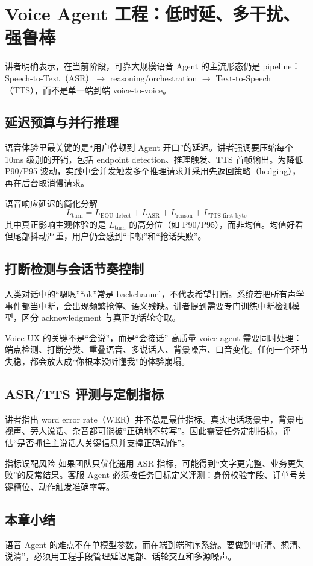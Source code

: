 \section{Voice Agent 工程：低时延、多干扰、强鲁棒}

讲者明确表示，在当前阶段，可靠大规模语音 Agent 的主流形态仍是 pipeline：Speech-to-Text（ASR）$\rightarrow$ reasoning/orchestration $\rightarrow$ Text-to-Speech（TTS），而不是单一端到端 voice-to-voice。

\subsection{延迟预算与并行推理}

语音体验里最关键的是“用户停顿到 Agent 开口”的延迟。讲者强调要压缩每个 10ms 级别的开销，包括 endpoint detection、推理触发、TTS 首帧输出。为降低 P90/P95 波动，实践中会并发触发多个推理请求并采用先返回策略（hedging），再在后台取消慢请求。

\begin{knowledgebox}{语音响应延迟的简化分解}
\[
L_{\text{turn}} = L_{\text{EOU-detect}} + L_{\text{ASR}} + L_{\text{reason}} + L_{\text{TTS-first-byte}}
\]
其中真正影响主观体验的是 $L_{\text{turn}}$ 的高分位（如 P90/P95），而非均值。均值好看但尾部抖动严重，用户仍会感到“卡顿”和“抢话失败”。
\end{knowledgebox}

\subsection{打断检测与会话节奏控制}

人类对话中的“嗯嗯”“ok”常是 backchannel，不代表希望打断。系统若把所有声学事件都当中断，会出现频繁抢停、语义残缺。讲者提到需要专门训练中断检测模型，区分 acknowledgment 与真正的话轮夺取。

\begin{importantbox}{Voice UX 的关键不是“会说”，而是“会接话”}
高质量 voice agent 需要同时处理：端点检测、打断分类、重叠语音、多说话人、背景噪声、口音变化。任何一个环节失稳，都会放大成“你根本没听懂我”的体验崩塌。
\end{importantbox}

\subsection{ASR/TTS 评测与定制指标}

讲者指出 word error rate（WER）并不总是最佳指标。真实电话场景中，背景电视声、旁人说话、杂音都可能被“正确地不转写”。因此需要任务定制指标，评估“是否抓住主说话人关键信息并支撑正确动作”。

\begin{warningbox}{指标误配风险}
如果团队只优化通用 ASR 指标，可能得到“文字更完整、业务更失败”的反常结果。客服 Agent 必须按任务目标定义评测：身份校验字段、订单号关键槽位、动作触发准确率等。
\end{warningbox}

\subsection{本章小结}

语音 Agent 的难点不在单模型参数，而在端到端时序系统。要做到“听清、想清、说清”，必须用工程手段管理延迟尾部、话轮交互和多源噪声。


